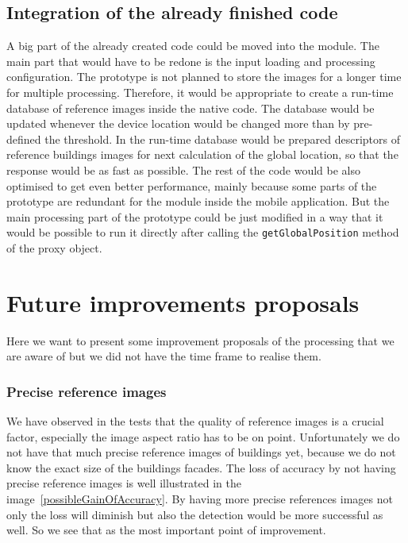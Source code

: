\documentclass[thesis=B,english]{FITthesis}[2019/12/23]
\begin{document}
        \subsection{Integration of the already finished code}
            A big part of the already created code could be moved into the module. The main part that would have to be redone is the input loading and processing configuration. The prototype is not planned to store the images for a longer time for multiple processing. Therefore, it would be appropriate to create a run-time database of reference images inside the native code. The database would be updated whenever the device location would be changed more than by pre-defined the threshold. In the run-time database would be prepared descriptors of reference buildings images for next calculation of the global location, so that the response would be as fast as possible. The rest of the code would be also optimised to get even better performance, mainly because some parts of the prototype are redundant for the module inside the mobile application. But the main processing part of the prototype could be just modified in a way that it would be possible to run it directly after calling the \texttt{getGlobalPosition} method of the proxy object.
    
    \section{Future improvements proposals}
        Here we want to present some improvement proposals of the processing that we are aware of but we did not have the time frame to realise them.

            \subsubsection*{Precise reference images}
            We have observed in the tests that the quality of reference images is a crucial factor, especially the image aspect ratio has to be on point. Unfortunately we do not have that much precise reference images of buildings yet, because we do not know the exact size of the buildings facades. The loss of accuracy by not having precise reference images is well illustrated in the image~\ref{possibleGainOfAccuracy}. By having more precise references images not only the loss will diminish but also the detection would be more successful as well. So we see that as the most important point of improvement.
            
\end{document}
